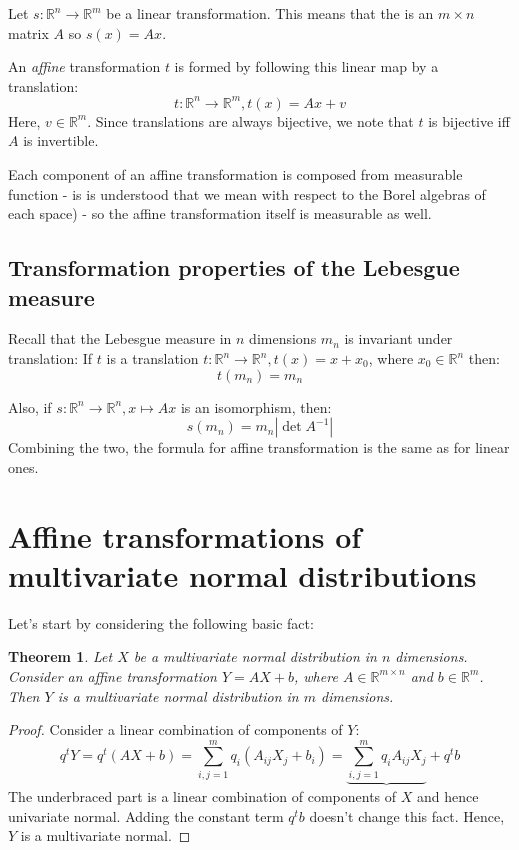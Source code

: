 \documentclass[12pt, a4paper]{article}
\newtheorem{theorem}{Theorem}[section]
\numberwithin{equation}{section}
\begin{document}
Let $s:\mathbb{R}^n\rightarrow\mathbb{R}^m$ be a linear transformation. This means that the is an $m\times n$ matrix $A$ so $s(x)=Ax$.

An \textit{affine} transformation $t$ is formed by following this linear map by a translation:
\begin{equation}
t:\mathbb{R}^n\rightarrow\mathbb{R}^m, t(x)=Ax+v
\end{equation}
Here, $v\in\mathbb{R}^m$. Since translations are always bijective, we note that $t$ is bijective iff $A$ is invertible.

Each component of an affine transformation is composed from measurable function - is is understood that we mean with respect to the Borel algebras of each space) - so the affine transformation itself is measurable as well.

\subsection{Transformation properties of the Lebesgue measure}
\label{euclidean_lebesgue_properties}
Recall that the Lebesgue measure in $n$ dimensions $m_n$ is invariant under translation: If $t$ is a translation $t:\mathbb{R}^n\rightarrow\mathbb{R}^n, t(x)=x+x_0$, where $x_0\in\mathbb{R}^n$ then:
\begin{equation}
t(m_n)=m_n
\end{equation}

Also, if $s:\mathbb{R}^n\rightarrow\mathbb{R}^n, x\mapsto Ax$ is an isomorphism, then:
\begin{equation}
\label{lebesgue_transform}
s(m_n)=m_n|\det A^{-1}|
\end{equation}
Combining the two, the formula for affine transformation is the same as for linear ones.

\section{Affine transformations of multivariate normal distributions}

Let's start by considering the following basic fact:
\begin{theorem}
Let $X$ be a multivariate normal distribution in $n$ dimensions. Consider an affine transformation $Y=AX+b$, where $A\in\mathbb{R}^{m\times n}$ and $b\in\mathbb{R}^m$. Then $Y$ is a multivariate normal distribution in $m$ dimensions.
\end{theorem}
\begin{proof}
Consider a linear combination of components of $Y$:
\begin{equation}
q^t Y=q^t(AX+b)=\sum_{i,j=1}^m q_i\left(A_{ij}X_j+b_i\right)=\underbrace{\sum_{i,j=1}^m q_i A_{ij}X_j}+q^t b
\end{equation}
The underbraced part is a linear combination of components of $X$ and hence univariate normal. Adding the constant term $q^t b$ doesn't change this fact. Hence, $Y$ is a multivariate normal.
\end{proof}
\end{document}
